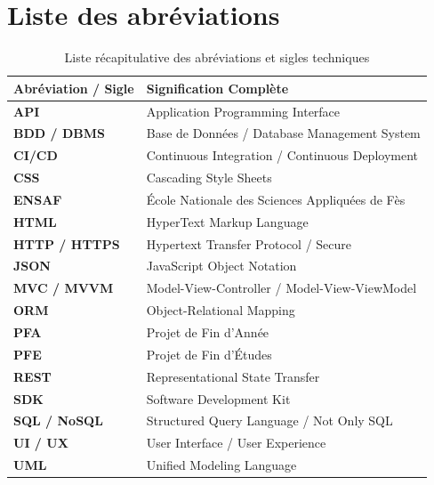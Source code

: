\chapter*{Liste des abr\'eviations}

\begin{table}[H]
\centering
\begin{tabularx}{\textwidth}{p{3.2cm} X}
\toprule
\textbf{Abr\'eviation / Sigle} & \textbf{Signification Compl\`ete} \\
\midrule
\textbf{API}       & Application Programming Interface \\
\textbf{BDD / DBMS}& Base de Donn\'ees / Database Management System \\
\textbf{CI/CD}     & Continuous Integration / Continuous Deployment \\
\textbf{CSS}       & Cascading Style Sheets \\
\textbf{ENSAF}     & \'Ecole Nationale des Sciences Appliqu\'ees de F\`es \\
\textbf{HTML}      & HyperText Markup Language \\
\textbf{HTTP / HTTPS}& Hypertext Transfer Protocol / Secure \\
\textbf{JSON}      & JavaScript Object Notation \\
\textbf{MVC / MVVM}& Model-View-Controller / Model-View-ViewModel \\
\textbf{ORM}       & Object-Relational Mapping \\
\textbf{PFA}       & Projet de Fin d'Ann\'ee \\
\textbf{PFE}       & Projet de Fin d'\'Etudes \\
\textbf{REST}      & Representational State Transfer \\
\textbf{SDK}       & Software Development Kit \\
\textbf{SQL / NoSQL}& Structured Query Language / Not Only SQL \\
\textbf{UI / UX}   & User Interface / User Experience \\
\textbf{UML}       & Unified Modeling Language \\
\bottomrule
\end{tabularx}
\caption{Liste r\'ecapitulative des abr\'eviations et sigles techniques}
\label{tab:abreviations}
\end{table}
